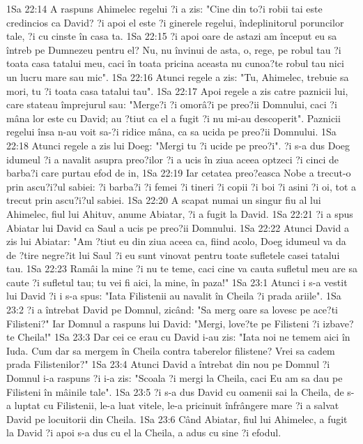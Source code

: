 1Sa 22:14  A raspuns Ahimelec regelui ?i a zis: "Cine din to?i robii tai este credincios ca David? ?i apoi el este ?i ginerele regelui, îndeplinitorul poruncilor tale, ?i cu cinste în casa ta.
1Sa 22:15  ?i apoi oare de astazi am început eu sa întreb pe Dumnezeu pentru el? Nu, nu învinui de asta, o, rege, pe robul tau ?i toata casa tatalui meu, caci în toata pricina aceasta nu cunoa?te robul tau nici un lucru mare sau mic".
1Sa 22:16  Atunci regele a zis: "Tu, Ahimelec, trebuie sa mori, tu ?i toata casa tatalui tau".
1Sa 22:17  Apoi regele a zis catre paznicii lui, care stateau împrejurul sau: "Merge?i ?i omorâ?i pe preo?ii Domnului, caci ?i mâna lor este cu David; au ?tiut ca el a fugit ?i nu mi-au descoperit". Paznicii regelui însa n-au voit sa-?i ridice mâna, ca sa ucida pe preo?ii Domnului.
1Sa 22:18  Atunci regele a zis lui Doeg: "Mergi tu ?i ucide pe preo?i". ?i s-a dus Doeg idumeul ?i a navalit asupra preo?ilor ?i a ucis în ziua aceea optzeci ?i cinci de barba?i care purtau efod de in,
1Sa 22:19  Iar cetatea preo?easca Nobe a trecut-o prin ascu?i?ul sabiei: ?i barba?i ?i femei ?i tineri ?i copii ?i boi ?i asini ?i oi, tot a trecut prin ascu?i?ul sabiei.
1Sa 22:20  A scapat numai un singur fiu al lui Ahimelec, fiul lui Ahituv, anume Abiatar, ?i a fugit la David.
1Sa 22:21  ?i a spus Abiatar lui David ca Saul a ucis pe preo?ii Domnului.
1Sa 22:22  Atunci David a zis lui Abiatar: "Am ?tiut eu din ziua aceea ca, fiind acolo, Doeg idumeul va da de ?tire negre?it lui Saul ?i eu sunt vinovat pentru toate sufletele casei tatalui tau.
1Sa 22:23  Ramâi la mine ?i nu te teme, caci cine va cauta sufletul meu are sa caute ?i sufletul tau; tu vei fi aici, la mine, în paza!"
1Sa 23:1  Atunci i s-a vestit lui David ?i i s-a spus: "Iata Filistenii au navalit în Cheila ?i prada ariile".
1Sa 23:2  ?i a întrebat David pe Domnul, zicând: "Sa merg oare sa lovesc pe ace?ti Filisteni?" Iar Domnul a raspuns lui David: "Mergi, love?te pe Filisteni ?i izbave?te Cheila!"
1Sa 23:3  Dar cei ce erau cu David i-au zis: "Iata noi ne temem aici în Iuda. Cum dar sa mergem în Cheila contra taberelor filistene? Vrei sa cadem prada Filistenilor?"
1Sa 23:4  Atunci David a întrebat din nou pe Domnul ?i Domnul i-a raspuns ?i i-a zis: "Scoala ?i mergi la Cheila, caci Eu am sa dau pe Filisteni în mâinile tale".
1Sa 23:5  ?i s-a dus David cu oamenii sai la Cheila, de s-a luptat cu Filistenii, le-a luat vitele, le-a pricinuit înfrângere mare ?i a salvat David pe locuitorii din Cheila.
1Sa 23:6  Când Abiatar, fiul lui Ahimelec, a fugit la David ?i apoi s-a dus cu el la Cheila, a adus cu sine ?i efodul.
